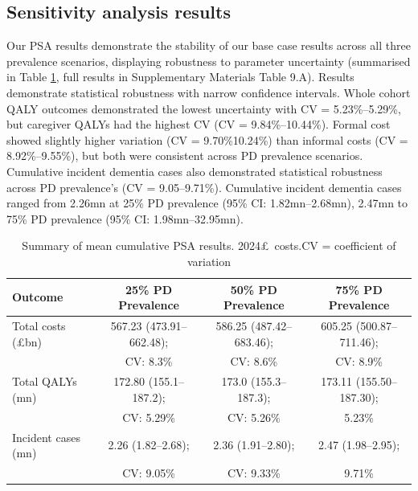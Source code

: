 \documentclass[11pt,a4paper]{article}
\begin{document}
\subsection{Sensitivity analysis results}

Our PSA results demonstrate the stability of our base case results across all three prevalence scenarios, displaying robustness to parameter uncertainty (summarised in Table \ref{tab:psa}, full results in Supplementary Materials Table 9.A). Results demonstrate statistical robustness with narrow confidence intervals. Whole cohort QALY outcomes demonstrated the lowest uncertainty with CV = 5.23\%--5.29\%, but caregiver QALYs had the highest CV (CV = 9.84\%--10.44\%). Formal cost showed slightly higher variation (CV = 9.70\%10.24\%) than informal costs (CV = 8.92\%--9.55\%), but both were consistent across PD prevalence scenarios. Cumulative incident dementia cases also demonstrated statistical robustness across PD prevalence's (CV = 9.05--9.71\%). Cumulative incident dementia cases ranged from 2.26mn at 25\% PD prevalence (95\% CI: 1.82mn--2.68mn), 2.47mn to 75\% PD prevalence (95\% CI: 1.98mn--32.95mn).

\begin{table}[htbp]
\centering
\caption{Summary of mean cumulative PSA results. 2024\pounds\ costs.CV = coefficient of variation}
\label{tab:psa}
\small
\begin{tabular}{lccc}
\toprule
\textbf{Outcome} & \textbf{25\% PD Prevalence} & \textbf{50\% PD Prevalence} & \textbf{75\% PD Prevalence} \\
\midrule
Total costs (\pounds bn) & 567.23 (473.91--662.48); & 586.25 (487.42--683.46); & 605.25 (500.87--711.46); \\
 & CV: 8.3\% & CV: 8.6\% & CV: 8.9\% \\
Total QALYs (mn) & 172.80 (155.1--187.2); & 173.0 (155.3--187.3); & 173.11 (155.50--187.30); \\
 & CV: 5.29\% & CV: 5.26\% & 5.23\% \\
Incident cases (mn) & 2.26 (1.82--2.68); & 2.36 (1.91--2.80); & 2.47 (1.98--2.95); \\
 & CV: 9.05\% & CV: 9.33\% & 9.71\% \\
\bottomrule
\end{tabular}
\end{table}
\end{document}
